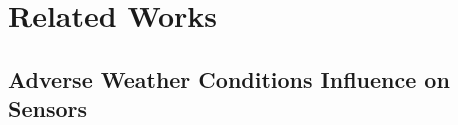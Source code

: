 \documentclass[report.tex]{subfiles}
\begin{document}
    \chapter{Related Works}

    \section{Adverse Weather Conditions Influence on Sensors}
    \label{sec:weather_influence_on_sensors}



\end{document}
